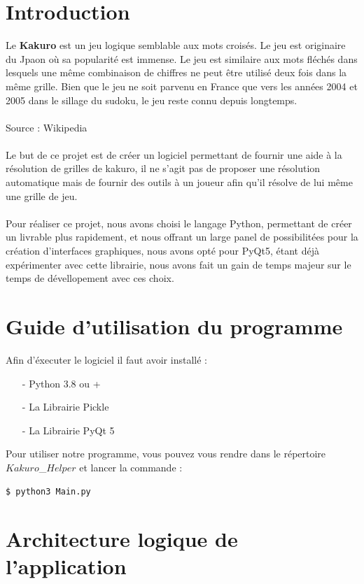 \documentclass[french,12pt]{article}
\begin{document}
\thispagestyle{empty}
\setcounter{page}{0}
\newpage
\renewcommand{\contentsname}{Table des matières}
\tableofcontents
\newpage


\section{Introduction}
Le \textbf{Kakuro} est un jeu logique semblable aux mots croisés. Le jeu est originaire du Jpaon où sa popularité est immense. Le jeu est similaire aux mots fléchés dans lesquels une même combinaison de chiffres ne peut être utilisé deux fois dans la même grille. Bien que le jeu ne soit parvenu en France que vers les années 2004 et 2005 dans le sillage du sudoku, le jeu reste connu depuis longtemps. \\ \\ Source : Wikipedia \\ \\
Le but de ce projet est de créer un logiciel permettant de fournir une aide à la résolution de grilles de kakuro, il ne s'agit pas de proposer une résolution automatique mais de fournir des outils à un joueur afin qu'il résolve de lui même une grille de jeu. \\\ \\
Pour réaliser ce projet, nous avons choisi le langage Python, permettant de créer un livrable plus rapidement, et nous offrant un large panel de possibilitées pour la création d'interfaces graphiques, nous avons opté pour PyQt5, étant déjà expérimenter avec cette librairie, nous avons fait un gain de temps majeur sur le temps de dévellopement avec ces choix.
\section{Guide d'utilisation du programme}
Afin d'éxecuter le logiciel il faut avoir installé :
\begin{enumerate}
\item[-] Python 3.8 ou +
\item[-] La Librairie Pickle
\item[-] La Librairie PyQt 5
\end{enumerate} 
Pour utiliser notre programme, vous pouvez vous rendre dans le répertoire $Kakuro$\_$Helper$ et lancer la commande :
\begin{lstlisting}[language=bash]
  $ python3 Main.py
\end{lstlisting}

\newpage

\section{Architecture logique de l'application}
\end{document}
